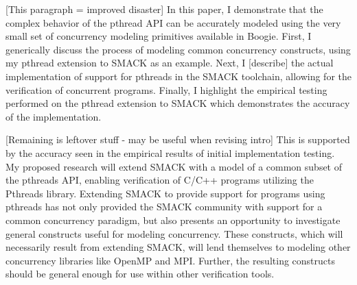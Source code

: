 [This paragraph = improved disaster]
In this paper, I demonstrate that the complex behavior of the pthread
API can be accurately modeled using the very small set of concurrency
modeling primitives available in Boogie.  First, I generically discuss
the process of modeling common concurrency constructs, using my
pthread extension to SMACK as an example. Next, I [describe] the
actual implementation of support for pthreads in the SMACK toolchain,
allowing for the verification of concurrent programs.  Finally, I
highlight the empirical testing performed on the pthread extension to
SMACK which demonstrates the accuracy of the implementation.   


[Remaining is leftover stuff - may be useful when revising intro]
This is supported by the accuracy seen in the empirical results of
initial implementation testing.  My proposed research will extend
SMACK with a model of a common subset of the pthreads API, enabling
verification of C/C++ programs utilizing the Pthreads library.
Extending SMACK to provide support for programs using pthreads has not
only provided the SMACK community with support for a common
concurrency paradigm, but also presents an opportunity to investigate
general constructs useful for modeling concurrency.  These constructs,
which will necessarily result from extending SMACK, will lend
themselves to modeling other concurrency libraries like OpenMP and
MPI.  Further, the resulting constructs should be general enough for
use within other verification tools. 
